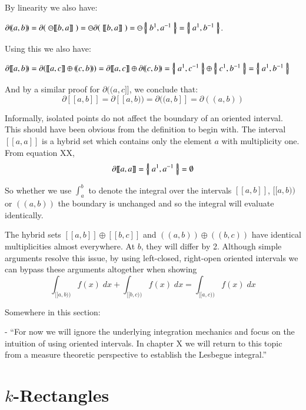 By linearity we also have:

$\partial (\!(a,b)\!) = \partial ( \; \ominus [\![b,a]\!] \; )= \ominus \partial ( \; [\![b,a]\!] \; ) = \ominus \hset{ b^1, a^{-1} } = \hset{ a^1, b^{-1}}$.

Using this we also have:

$\partial [\![a,b)\!) = \partial ( [\![a,c]\!] \oplus (\!(c,b)\!) ) = \partial [\![a,c]\!] \oplus \partial (\!(c,b)\!) =  \hset{ a^1, c^{-1} } \oplus \hset{ c^1, b^{-1} } = \hset{a^1, b^{-1} }$

And by a similar proof for $\partial (\!(a,c]\!]$, we conclude that:
\begin{equation}
	\partial [\![a,b]\!] = \partial [\![a,b)\!) = \partial (\!(a,b]\!] = \partial (\!(a,b)\!)
\end{equation}


Informally, isolated points do not affect the boundary of an oriented interval.
This should have been obvious from the definition to begin with.
The interval $[\![ a,a ]\!]$ is a hybrid set which contains only the element $a$ with multiplicity one.
From equation XX,
\begin{equation}
	\partial [\![ a,a ]\!] = \left\{ \! \left| \; a^1, a^{-1} \; \right| \! \right\} = \emptyset
\end{equation}

So whether we use $\int_a^b$ to denote the integral over the intervals $[\![a,b]\!]$, $[\![a,b)\!)$ or  $(\!(a,b)\!)$ the boundary is unchanged and so the integral will evaluate identically.

The hybrid sets $[\![a,b]\!] \oplus [\![b,c]\!]$ and $(\!(a,b)\!) \oplus (\!(b,c)\!)$ have identical multiplicities almost everywhere.
At $b$, they will differ by 2. 
Although simple arguments resolve this issue, by using left-closed, right-open oriented intervals we can bypass these arguments altogether when showing
\begin{equation}
	\int_{[\![a,b)\!)} f(x) \; dx + \int_{[\![b,c)\!)} f(x) \; dx = \int_{[\![a,c)\!)} f(x) \; dx
\end{equation}

Somewhere in this section:

- ``For now we will ignore the underlying integration mechanics and focus on the intuition of using oriented intervals. In chapter X we will return to this topic from a measure theoretic perspective to establish the Lesbegue integral.''

\section{$k$-Rectangles}

